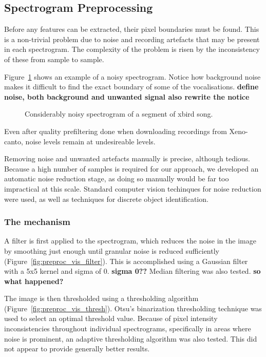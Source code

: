 \subsection{Spectrogram Preprocessing}\label{sec:preproc}

Before any features can be extracted, their pixel boundaries must be found.
This is a non-trivial problem due to noise and recording artefacts
that may be present in each spectrogram.
The complexity of the problem is risen by the inconsistency of these from sample
to sample.

Figure~\ref{fig:sgram_noise} shows an example of a noisy spectrogram.
Notice how background noise makes it difficult to find the exact boundary of
some of the vocalisations.
\textbf{define noise, both background and unwanted signal also rewrite the notice}

\begin{figure}[h]
  \centering

  \caption{Considerably noisy spectrogram of a segment of xbird song.}
  \label{fig:sgram_noise}
\end{figure}

Even after quality prefiltering done when downloading recordings from
Xeno-canto, noise levels remain at undesireable levels.

Removing noise and unwanted artefacts manually is precise, although tedious.
Because a high number of samples is required for our approach, we developed an
automatic noise reduction stage, as doing so manually would be far too
impractical at this scale.
Standard computer vision techinques for noise reduction were used, as well as
techniques for discrete object identification.

\subsubsection{The mechanism}
A filter is first applied to the spectrogram, which reduces the noise in the
image by smoothing just enough until granular noise is reduced sufficiently
(Figure~\ref{fig:preproc_vis_filter}).
This is accomplished using a Gaussian filter with a 5x5 kernel and sigma of 0.
\textbf{sigma 0??}
Median filtering was also tested. \textbf{so what happened?}

The image is then thresholded using a thresholding algorithm
(Figure~\ref{fig:preproc_vis_thresh}).
Otsu's binarization thresholding technique \parencite{otsu1979} was used to
select an optimal threshold value.
Because of pixel intensity inconsistencies throughout individual spectrograms,
specifically in areas where noise is prominent, an adaptive thresholding
algorithm was also tested.
This did not appear to provide generally better results.

